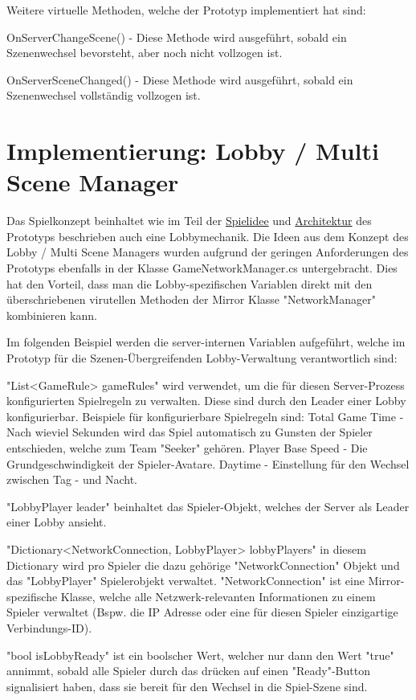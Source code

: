 Weitere virtuelle Methoden, welche der Prototyp implementiert hat sind:

OnServerChangeScene() - Diese Methode wird ausgeführt, sobald ein Szenenwechsel bevorsteht, aber noch nicht vollzogen ist.

OnServerSceneChanged() - Diese Methode wird ausgeführt, sobald ein Szenenwechsel vollständig vollzogen ist.

\section{Implementierung: Lobby / Multi Scene Manager}
\label{Lobby Manager Implementierung}

Das Spielkonzept beinhaltet wie im Teil der \hyperref[Spielidee]{Spielidee} und \hyperref[Architektur]{Architektur} des Prototyps beschrieben auch eine Lobbymechanik. Die Ideen aus dem Konzept des Lobby / Multi Scene Managers wurden aufgrund der geringen Anforderungen des Prototyps ebenfalls in der Klasse GameNetworkManager.cs untergebracht. Dies hat den Vorteil, dass man die Lobby-spezifischen Variablen direkt mit den überschriebenen virutellen Methoden der Mirror Klasse "NetworkManager" kombinieren kann.

Im folgenden Beispiel werden die server-internen Variablen aufgeführt, welche im Prototyp für die Szenen-Übergreifenden Lobby-Verwaltung verantwortlich sind:

"List<GameRule> gameRules" wird verwendet, um die für diesen Server-Prozess konfigurierten Spielregeln zu verwalten. Diese sind durch den Leader einer Lobby konfigurierbar. Beispiele für konfigurierbare Spielregeln sind: 
Total Game Time - Nach wieviel Sekunden wird das Spiel automatisch zu Gunsten der Spieler entschieden, welche zum Team "Seeker" gehören.
Player Base Speed - Die Grundgeschwindigkeit der Spieler-Avatare.
Daytime - Einstellung für den Wechsel zwischen Tag - und Nacht.

"LobbyPlayer leader" beinhaltet das Spieler-Objekt, welches der Server als Leader einer Lobby ansieht.

"Dictionary<NetworkConnection, LobbyPlayer> lobbyPlayers" in diesem Dictionary wird pro Spieler die dazu gehörige "NetworkConnection" Objekt und das "LobbyPlayer" Spielerobjekt verwaltet. "NetworkConnection" ist eine Mirror-spezifische Klasse, welche alle Netzwerk-relevanten Informationen zu einem Spieler verwaltet (Bspw. die IP Adresse oder eine für diesen Spieler einzigartige Verbindungs-ID).

"bool isLobbyReady" ist ein boolscher Wert, welcher nur dann den Wert "true" annimmt, sobald alle Spieler durch das drücken auf einen "Ready"-Button signalisiert haben, dass sie bereit für den Wechsel in die Spiel-Szene sind.


